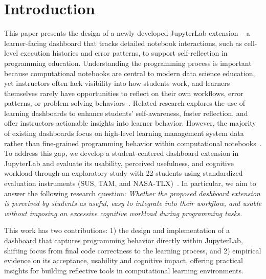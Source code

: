 \documentclass[acmsmall]{acmart}
\begin{document}
\maketitle
\section{Introduction}

This paper presents the design of a newly developed JupyterLab extension -- a learner-facing dashboard that tracks detailed notebook interactions, such as cell-level execution histories and error patterns, to support self-reflection in programming education.
Understanding the programming process is important because computational notebooks are central to modern data science education, yet instructors often lack visibility into how students work, and learners themselves rarely have opportunities to reflect on their own workflows, error patterns, or problem-solving behaviors~\cite{perkel2018jupyter, robinson2022error}.
Related research explores the use of learning dashboards to enhance students' self-awareness, foster reflection, and offer instructors actionable insights into learner behavior.
However, the majority of existing dashboards focus on high-level learning management system data rather than fine-grained programming behavior within computational notebooks~\cite{paulsen2024learning}.
To address this gap, we develop a student-centered dashboard extension in JupyterLab and evaluate its usability, perceived usefulness, and cognitive workload through an exploratory study with 22 students using standardized evaluation instruments (SUS, TAM, and NASA-TLX)~\cite{germanupa_sus, davis1989technology, hart1988development}.
In particular, we aim to answer the following research question: \textit{Whether the proposed dashboard extension is perceived by students as useful, easy to integrate into their workflow, and usable without imposing an excessive cognitive workload during programming tasks.}

This work has two contributions: 1) the design and implementation of a dashboard that captures programming behavior directly within JupyterLab, shifting focus from final code correctness to the learning process, and 2) empirical evidence on its acceptance, usability and cognitive impact, offering practical insights for building reflective tools in computational learning environments.
\end{document}
